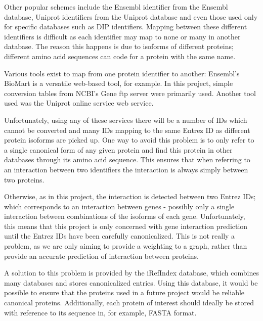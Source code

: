 Other popular schemes include the Ensembl identifier from the Ensembl database\autocite{ensembl_website}, Uniprot identifiers from the Uniprot database\autocite{uniprot_website} and even those used only for specific databases such as DIP identifiers\autocite{dip_website}.
Mapping between these different identifiers is difficult as each identifier may map to none or many in another database.
The reason this happens is due to isoforms of different proteins; different amino acid sequences can code for a protein with the same name.


Various tools exist to map from one protein identifier to another: Ensembl's BioMart\autocite{smedley_biomart_2009} is a versatile web-based tool, for example.
In this project, simple conversion tables from NCBI's Gene\autocite{maglott_entrez_2007} ftp server were primarily used.
Another tool used was the Uniprot\autocite{consortium_universal_2007} online service web service.

Unfortunately, using any of these services there will be a number of IDs which cannot be converted and many IDs mapping to the same Entrez ID as different protein isoforms are picked up.
One way to avoid this problem is to only refer to a single canonical form of any given protein and find this protein in other databases through its amino acid sequence.
This ensures that when referring to an interaction between two identifiers the interaction is always simply between two proteins.

Otherwise, as in this project, the interaction is detected between two Entrez IDs; which corresponds to an interaction between genes - possibly only a single interaction between combinations of the isoforms of each gene.
Unfortunately, this means that this project is only concerned with gene interaction prediction until the Entrez IDs have been carefully canonicalized.
This is not really a problem, as we are only aiming to provide a weighting to a graph, rather than provide an accurate prediction of interaction between proteins.

A solution to this problem is provided by the iRefIndex\autocite{razick_irefindex:_2008} database, which combines many databases and stores canonicalized entries.
Using this database, it would be possible to ensure that the proteins used in a future project would be reliable canonical proteins.
Additionally, each protein of interest should ideally be stored with reference to its sequence in, for example, FASTA format.

